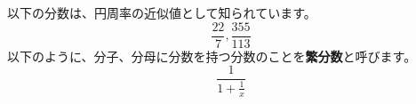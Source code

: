 \documentclass{ltjsarticle}
\begin{document}
以下の分数は、円周率の近似値として知られています。
\[ \frac{22}{7}, \frac{355}{113} \]
以下のように、分子、分母に分数を持つ分数のことを\textbf{繁分数}と呼びます。
\[ \frac{1}{1 + \frac{1}{x}} \]
\end{document}
